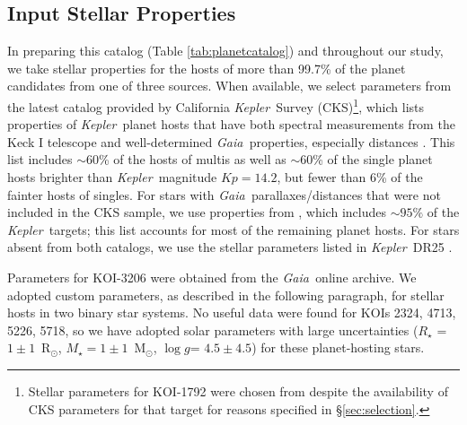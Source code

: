 \documentclass{aastex62}
\newcommand{\ik}{{\it Kepler~}}
\newcommand{\gaia}{{\it Gaia~}}
\newcommand{\logg}{\ensuremath{\log{g}}}
\newcommand{\rsun}{R\ensuremath{_\odot}}
\newcommand{\msun}{M\ensuremath{_\odot}}
\begin{document}
\subsection{Input Stellar Properties}\label{sec:star}

In preparing this catalog (Table \ref{tab:planetcatalog}) and throughout our study, we take stellar properties for the hosts of more than 99.7\% of the planet candidates from one of three sources.  When available, we select parameters from the latest catalog provided by California \ik Survey (CKS){\footnote{Stellar parameters for KOI-1792 were chosen from \cite{Berger:2020a} despite the availability of CKS parameters for that target for reasons specified in \S\ref{sec:selection}.}}, which lists properties of \ik planet hosts that have both spectral measurements from the Keck I telescope and well-determined \gaia properties, especially distances \citep{Fulton:2018}.  This list includes $\sim 60$\% of the hosts of multis as well as $\sim 60$\% of the single planet hosts brighter than \ik magnitude $Kp = 14.2$, but fewer than 6\% of the fainter hosts of singles. For stars with \gaia parallaxes/distances that were not included in the CKS sample, we use properties from  \cite{Berger:2020a}, which includes $\sim 95\%$ of the \ik targets; this list accounts for most of the remaining planet hosts.  For stars absent from both catalogs, we use the stellar parameters listed in \ik DR25 \citep{Thompson:2018}.  

Parameters for KOI-3206 were obtained from the \gaia online archive. We adopted custom parameters, as described in the following paragraph, for stellar hosts in two binary star systems.  No useful data were found for KOIs 2324, 4713, 5226, 5718, so we have adopted solar parameters with large uncertainties ($R_\star$ = $1\pm1$~\rsun, $M_\star = 1\pm1$~\msun, \logg = $4.5\pm4.5$) for these planet-hosting stars. 



\end{document}
